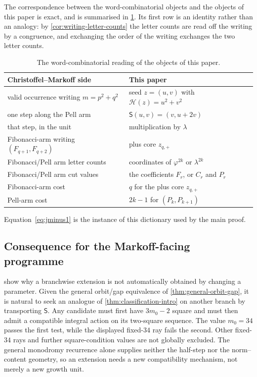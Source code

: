 The correspondence between the word-combinatorial objects and the objects of
this paper is exact, and is summarised in \cref{tab:dictionary}. Its first row
is an identity rather than an analogy: by \cref{cor:writing-letter-counts} the
letter counts are read off the writing by a congruence, and exchanging the
order of the writing exchanges the two letter counts.

\begin{table}[htbp]
\centering
\caption{The word-combinatorial reading of the objects of this paper.}
\label{tab:dictionary}
\begin{tabular}{@{}ll@{}}
\toprule
Christoffel--Markoff side & This paper\\
\midrule
valid occurrence writing $m=p^2+q^2$ & seed $z=(u,v)$ with $\mathcal H(z)=u^2+v^2$\\
one step along the Pell arm & $\mathsf S(u,v)=(v,u+2v)$\\
that step, in the unit & multiplication by $\lambda$\\
Fibonacci-arm writing $(F_{q+1},F_{q+2})$ & plus core $z_{q,+}$\\
Fibonacci/Pell arm letter counts & coordinates of $\varphi^{2k}$ or $\lambda^{2k}$\\
Fibonacci/Pell arm cut values & the coefficients $F_r$, or $C_r$ and $P_r$\\
Fibonacci-arm cost & $q$ for the plus core $z_{q,+}$\\
Pell-arm cost & $2k-1$ for $(P_k,P_{k+1})$\\
\bottomrule
\end{tabular}
\end{table}

Equation~\eqref{eq:jminus1} is the instance of this dictionary used by the
main proof.

\subsection{Consequence for the Markoff-facing programme}

 show why a branchwise
extension is not automatically obtained by changing a parameter. Given the general
orbit/gap equivalence of \cref{thm:general-orbit-gap}, it is natural to seek an
analogue of \cref{thm:classification-intro} on another branch by transporting
$\mathsf S$. Any candidate must first have $3m_0-2$ square and must then admit
a compatible integral action on its two-square sequence. The value $m_0=34$
passes the first test, while the displayed fixed-$34$ ray fails the second.
Other fixed-$34$ rays and further square-condition values are not globally
excluded. The general monodromy recurrence alone supplies neither the
half-step nor the norm--content geometry, so an extension needs a new
compatibility mechanism, not merely a new growth unit.
